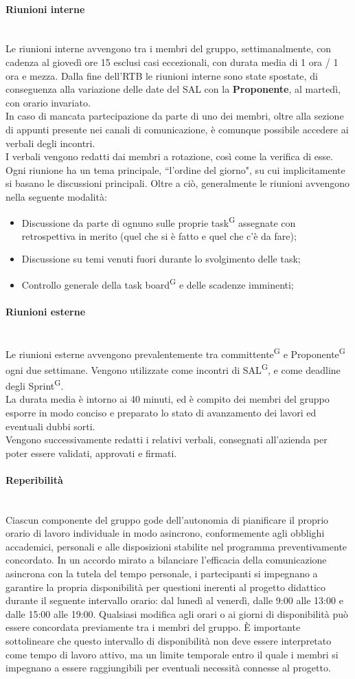 \documentclass[8pt]{article}
\newcommand{\glossterm}[1]{#1\textsuperscript{G}} %
\newcommand{\subsubsubsection}[1]{\paragraph{#1}\mbox{}\\}
\begin{document}
\subsubsubsection{Riunioni interne}
Le riunioni interne avvengono tra i membri del gruppo, settimanalmente, con cadenza al giovedì ore 15 esclusi casi eccezionali, con durata media di 1 ora / 1 ora e mezza. Dalla fine dell'RTB le riunioni interne sono state spostate, di conseguenza alla variazione delle date del SAL con la \textbf{Proponente}, al martedì, con orario invariato.\\
In caso di mancata partecipazione da parte di uno dei membri, oltre alla sezione di appunti presente nei canali di comunicazione, è comunque possibile accedere ai verbali degli incontri.\\
I verbali vengono redatti dai membri a rotazione, così come la verifica di esse.\\
Ogni riunione ha un tema principale, ``l'ordine del giorno", su cui implicitamente si basano le discussioni principali.
Oltre a ciò, generalmente le riunioni avvengono nella seguente modalità:
\begin{itemize}
  \item Discussione da parte di ognuno sulle proprie \glossterm{task} assegnate con retrospettiva in merito
      (quel che si è fatto e quel che c'è da fare);
  \item Discussione su temi venuti fuori durante lo svolgimento delle task;
  \item Controllo generale della task \glossterm{board} e delle scadenze imminenti;
\end{itemize}

\subsubsubsection{Riunioni esterne}
Le riunioni esterne avvengono prevalentemente tra \glossterm{committente} e \glossterm{Proponente} ogni due
settimane. Vengono utilizzate come incontri di \glossterm{SAL}, e come deadline degli \glossterm{Sprint}.\\
La durata media è intorno ai 40 minuti, ed è compito dei membri del gruppo esporre in modo conciso e preparato lo stato di avanzamento dei lavori ed eventuali dubbi sorti.\\
Vengono successivamente redatti i relativi verbali, consegnati all'azienda per poter essere validati, approvati e firmati.

\subsubsubsection{Reperibilità}
Ciascun componente del gruppo gode dell'autonomia di pianificare il proprio orario di lavoro individuale in modo asincrono, conformemente agli obblighi accademici, personali e alle disposizioni stabilite nel programma preventivamente concordato.
In un accordo mirato a bilanciare l'efficacia della comunicazione asincrona con la tutela del tempo personale, i partecipanti si impegnano a garantire la propria disponibilità per questioni inerenti al progetto didattico durante il seguente intervallo orario: dal lunedì al venerdì, dalle 9:00 alle 13:00 e dalle 15:00 alle 19:00. Qualsiasi modifica agli orari o ai giorni di disponibilità può essere concordata previamente tra i membri del gruppo. È importante sottolineare che questo intervallo di disponibilità non deve essere interpretato come tempo di lavoro attivo, ma un limite temporale entro il quale i membri si impegnano a essere raggiungibili per eventuali necessità connesse al progetto.
\end{document}

